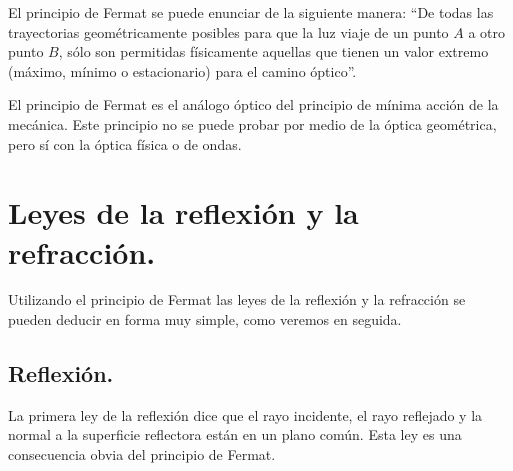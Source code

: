 \documentclass[14pt]{extarticle}
\begin{document}
El principio de Fermat se puede enunciar de la siguiente manera: \enquote{De todas las trayectorias geométricamente posibles para que la luz viaje de un punto $A$ a otro punto $B$, sólo son permitidas físicamente aquellas que tienen un valor extremo (máximo, mínimo o estacionario) para el camino óptico}.

El principio de Fermat es el análogo óptico del principio de mínima acción de la mecánica. Este principio no se puede probar por medio de la óptica geométrica, pero sí con la óptica física o de ondas.

\section{Leyes de la reflexión y la refracción.}

Utilizando el principio de Fermat las leyes de la reflexión y la refracción se pueden deducir en forma muy simple, como veremos en seguida.

\subsection{Reflexión.}

La primera ley de la reflexión dice que el rayo incidente, el rayo reflejado y la normal a la superficie reflectora están en un plano común. Esta ley es una consecuencia obvia del principio de Fermat.
\end{document}
